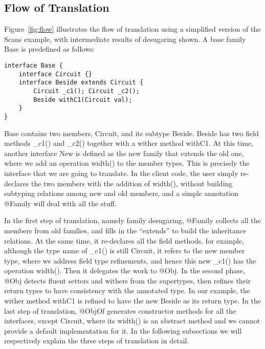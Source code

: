 \subsection{Flow of Translation}
Figure~\ref{fig:flow} illustrates the flow of translation using a simplified version of the Scans example, with intermediate results of desugaring shown. A base family \textsf{Base} is predefined as follows:
\begin{lstlisting}
interface Base {
	interface Circuit {}
	interface Beside extends Circuit {
		Circuit _c1(); Circuit _c2();
		Beside withC1(Circuit val);
	}
}
\end{lstlisting}
\textsf{Base} contains two members, \textsf{Circuit}, and its subtype \textsf{Beside}. \textsf{Beside} has two field methods \textsf{\_c1()} and \textsf{\_c2()} together with a wither method \textsf{withC1}. At this time, another interface \textsf{New} is defined as the new family that extends the old one, where we add an operation \textsf{width()} to the member types. This is precisely the interface that we are going to translate. In the client code, the user simply re-declares the two members with the addition of \textsf{width()}, without building subtyping relations among new and old members, and a simple annotation \textsf{@Family} will deal with all the stuff.

In the first step of translation, namely family desugaring, \textsf{@Family} collects all the members from old families, and fills in the ``extends'' to build the inheritance relations. At the same time, it re-declares all the field methods, for example, although the type name of \textsf{\_c1()} is still \textsf{Circuit}, it refers to the new member type, where we address field type refinements, and hence this new \textsf{\_c1()} has the operation \textsf{width()}. Then it delegates the work to \textsf{@Obj}. In the second phase, \textsf{@Obj} detects fluent setters and withers from the supertypes, then refines their return types to have consistency with the annotated type. In our example, the wither method \textsf{withC1} is refined to have the new \textsf{Beside} as its return type. In the last step of translation, \textsf{@ObjOf} generates constructor methods for all the interfaces, except \textsf{Circuit}, where its \textsf{width()} is an abstract method and we cannot provide a default implementation for it. In the following subsections we will respectively explain the three steps of translation in detail.

